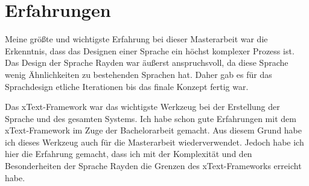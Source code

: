 \section{Erfahrungen}

Meine größte und wichtigste Erfahrung bei dieser Masterarbeit war die Erkenntnis, dass das Designen einer Sprache ein höchst komplexer Prozess ist. Das Design der Sprache Rayden war äußerst anspruchsvoll, da diese Sprache wenig Ähnlichkeiten zu bestehenden Sprachen hat. Daher gab es für das Sprachdesign etliche Iterationen bis das finale Konzept fertig war.

\SuperPar
Das xText-Framework war das wichtigste Werkzeug bei der Erstellung der Sprache und des gesamten Systems. Ich habe schon gute Erfahrungen mit dem xText-Framework im Zuge der Bachelorarbeit gemacht. Aus diesem Grund habe ich dieses Werkzeug auch für die Masterarbeit wiederverwendet. Jedoch habe ich hier die Erfahrung gemacht, dass ich mit der Komplexität und den Besonderheiten der Sprache Rayden die Grenzen des xText-Frameworks erreicht habe.
